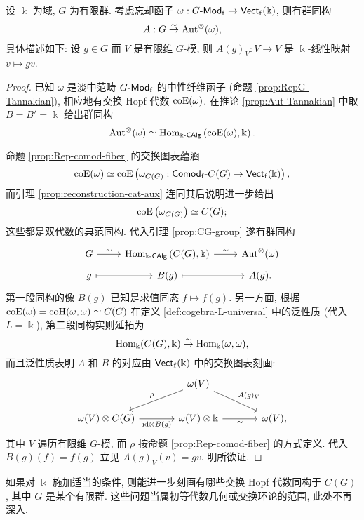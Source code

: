 \begin{theorem}\label{prop:Tannaka-Krein}
	设 $\Bbbk$ 为域, $G$ 为有限群. 考虑忘却函子 $\omega: G\text{-}\mathsf{Mod}_{\mathrm{f}} \to \mathsf{Vect}_{\mathrm{f}}(\Bbbk)$, 则有群同构
	\[ A: G \stackrel{\sim}{\rightarrow} \operatorname{Aut}^\otimes(\omega), \]
	具体描述如下: 设 $g \in G$ 而 $V$ 是有限维 $G$-模, 则 $A(g)_V: V \to V$ 是 $\Bbbk$-线性映射 $v \mapsto gv$.
\end{theorem}
\begin{proof}
	已知 $\omega$ 是淡中范畴 $G\text{-}\mathsf{Mod}_{\mathrm{f}}$ 的中性纤维函子 (命题 \ref{prop:RepG-Tannakian}), 相应地有交换 Hopf 代数 $\operatorname{coE}(\omega)$. 在推论 \ref{prop:Aut-Tannakian} 中取 $B = B' = \Bbbk$ 给出群同构
	\[ \operatorname{Aut}^{\otimes}(\omega) \simeq \operatorname{Hom}_{\Bbbk\text{-}\mathsf{CAlg}}\left(\operatorname{coE}(\omega), \Bbbk \right). \]

	命题 \ref{prop:Rep-comod-fiber} 的交换图表蕴涵
	\[ \operatorname{coE}(\omega) \simeq \operatorname{coE}\left(\omega_{C(G)}: \mathsf{Comod}_{\mathrm{f}}\text{-}C(G) \to \mathsf{Vect}_{\mathrm{f}}(\Bbbk) \right), \]
	而引理 \ref{prop:reconstruction-cat-aux} 连同其后说明进一步给出
	\[ \operatorname{coE}\left( \omega_{C(G)} \right) \simeq C(G); \]
	这些都是双代数的典范同构. 代入引理 \ref{prop:CG-group} 遂有群同构
	\[\begin{tikzcd}[row sep=tiny]
		G \arrow[r, "\sim"] & \Hom_{\Bbbk\dcate{CAlg}}\left(C(G), \Bbbk \right) \arrow[r, "\sim"] & \Aut^{\otimes}(\omega) \\
		g \arrow[mapsto, r] & B(g) \arrow[mapsto, r] & A(g).
	\end{tikzcd}\]
	第一段同构的像 $B(g)$ 已知是求值同态 $f \mapsto f(g)$. 另一方面, 根据 $\operatorname{coE}(\omega) = \operatorname{coH}(\omega, \omega) \simeq C(G)$ 在定义 \ref{def:cogebra-L-universal} 中的泛性质 (代入 $L = \Bbbk$), 第二段同构实则延拓为
	\[ \operatorname{Hom}_{\Bbbk}(C(G), \Bbbk) \stackrel{\sim}{\rightarrow} \operatorname{Hom}_{\Bbbk}(\omega, \omega), \]
	而且泛性质表明 $A$ 和 $B$ 的对应由 $\mathsf{Vect}_{\mathrm{f}}(\Bbbk)$ 中的交换图表刻画:
	\[\begin{tikzcd}[column sep=large]
		& \omega(V) \arrow[ld, "\rho"'] \arrow[rd, "{A(g)_V}"] & \\
		\omega(V) \otimes C(G) \arrow[r, "{\identity \otimes B(g)}"'] & \omega(V) \otimes \Bbbk \arrow[r, "\sim"'] & \omega(V),
	\end{tikzcd}\]
	其中 $V$ 遍历有限维 $G$-模, 而 $\rho$ 按命题 \ref{prop:Rep-comod-fiber} 的方式定义. 代入 $B(g)(f) = f(g)$ 立见 $A(g)_V(v) = gv$. 明所欲证.
\end{proof}

如果对 $\Bbbk$ 施加适当的条件, 则能进一步刻画有哪些交换 Hopf 代数同构于 $C(G)$, 其中 $G$ 是某个有限群. 这些问题当属初等代数几何或交换环论的范围, 此处不再深入.

